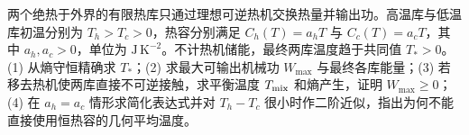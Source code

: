 两个绝热于外界的有限热库只通过理想可逆热机交换热量并输出功。高温库与低温库初温分别为 \(T_h>T_c>0\)，热容分别满足 \(C_h(T)=a_hT\) 与 \(C_c(T)=a_cT\)，其中 \(a_h,a_c>0\)，单位为 \(\mathrm{J\,K^{-2}}\)。不计热机储能，最终两库温度趋于共同值 \(T_* >0\)。
(1) 从熵守恒精确求 \(T_*\)；(2) 求最大可输出机械功 \(W_{\max}\) 与最终各库能量；(3) 若移去热机使两库直接不可逆接触，求平衡温度 \(T_{\rm mix}\) 和熵产生，证明 \(W_{\max}\ge0\)；(4) 在 \(a_h=a_c\) 情形求简化表达式并对 \(T_h-T_c\) 很小时作二阶近似，指出为何不能直接使用恒热容的几何平均温度。
